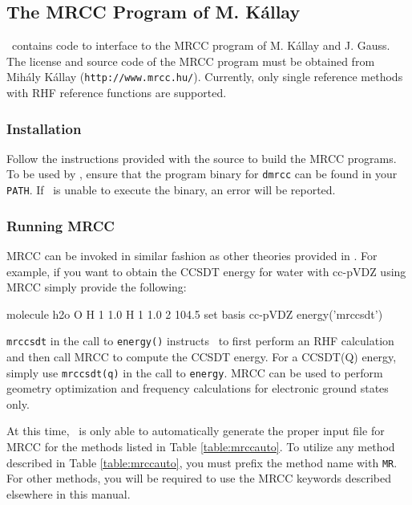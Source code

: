 \subsection{The MRCC Program of M. K\'{a}llay} \label{sec:mrcc}
\PSIfour\ contains code to interface to the MRCC program of M. K\'{a}llay
and J. Gauss.  The license and source code of the MRCC program must be
obtained from Mih\'{a}ly K\'{a}llay ({\tt http://www.mrcc.hu/}). Currently,
only single reference methods with RHF reference functions are supported.

\renewcommand{\optionname}[2]{\texttt{\nameref{op-#2-#1}}}

\subsubsection{Installation}
Follow the instructions provided with the source to build the MRCC programs.
To be used by \PSIfour, ensure that the program binary for {\tt dmrcc} can be
found in your {\tt PATH}. If \PSIfour\ is unable to execute the binary, an
error will be reported.

\subsubsection{Running MRCC}
MRCC can be invoked in similar fashion as other theories provided in \PSIfour.
For example, if you want to obtain the CCSDT energy for water with cc-pVDZ using
MRCC simply provide the following:
\begin{Snippet}
molecule h2o {
    O
    H 1 1.0
    H 1 1.0 2 104.5
}
set {
    basis cc-pVDZ
}
energy('mrccsdt')
\end{Snippet}

{\tt mrccsdt} in the call to {\tt energy()} instructs \PSIfour\ to first
perform an RHF calculation and then call MRCC to compute the CCSDT energy.
For a CCSDT(Q) energy, simply use {\tt mrccsdt(q)} in the call to
{\tt energy}. MRCC can be used to perform geometry optimization and
frequency calculations for electronic ground states only.

At this time, \PSIfour\ is only able to automatically generate the proper
input file for MRCC for the methods listed in Table \ref{table:mrccauto}.
To utilize any method described in Table \ref{table:mrccauto}, you must prefix
the method name with {\tt MR}. For other methods, you will be required to
use the MRCC keywords described elsewhere in this manual.

